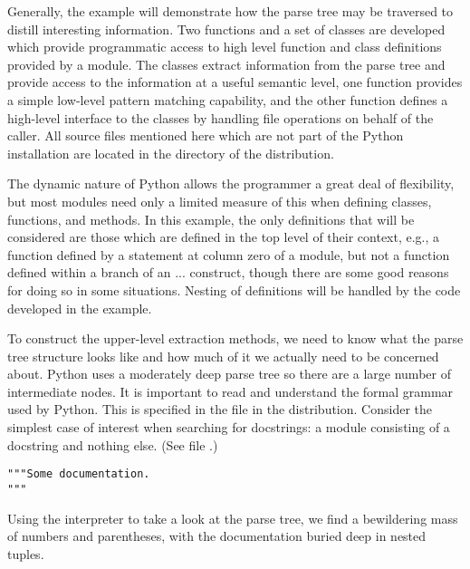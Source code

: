 Generally, the example will demonstrate how the parse tree may be
traversed to distill interesting information.  Two functions and a set
of classes are developed which provide programmatic access to high
level function and class definitions provided by a module.  The
classes extract information from the parse tree and provide access to
the information at a useful semantic level, one function provides a
simple low-level pattern matching capability, and the other function
defines a high-level interface to the classes by handling file
operations on behalf of the caller.  All source files mentioned here
which are not part of the Python installation are located in the
 directory of the distribution.

The dynamic nature of Python allows the programmer a great deal of
flexibility, but most modules need only a limited measure of this when
defining classes, functions, and methods.  In this example, the only
definitions that will be considered are those which are defined in the
top level of their context, e.g., a function defined by a 
statement at column zero of a module, but not a function defined
within a branch of an  ...  construct, though
there are some good reasons for doing so in some situations.  Nesting
of definitions will be handled by the code developed in the example.

To construct the upper-level extraction methods, we need to know what
the parse tree structure looks like and how much of it we actually
need to be concerned about.  Python uses a moderately deep parse tree
so there are a large number of intermediate nodes.  It is important to
read and understand the formal grammar used by Python.  This is
specified in the file  in the distribution.
Consider the simplest case of interest when searching for docstrings:
a module consisting of a docstring and nothing else.  (See file
.)

\begin{verbatim}
"""Some documentation.
"""
\end{verbatim}
%
Using the interpreter to take a look at the parse tree, we find a
bewildering mass of numbers and parentheses, with the documentation
buried deep in nested tuples.

